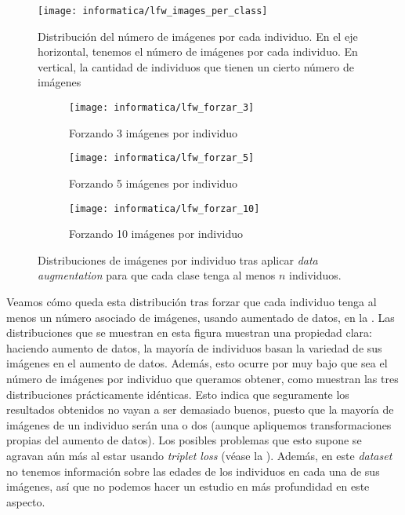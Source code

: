 \begin{figure}[!hbtp]
    \centering
    \texttt{[image: informatica/lfw\_images\_per\_class]}
    \caption{Distribución del número de imágenes por cada individuo. En el eje horizontal, tenemos el número de imágenes por cada individuo. En vertical, la cantidad de individuos que tienen un cierto número de imágenes}
    \label{img:ejemplo_cacd}
\end{figure}

\begin{figure}[hbtp!]
\centering
    \begin{subfigure}{0.5\textwidth}
        \centering
        \texttt{[image: informatica/lfw\_forzar\_3]}
        \caption{Forzando 3 imágenes por individuo }
    \end{subfigure}%
    \begin{subfigure}{.5\textwidth}
        \centering
        \texttt{[image: informatica/lfw\_forzar\_5]}
        \caption{Forzando 5 imágenes por individuo}
    \end{subfigure}

    \begin{subfigure}{.5\textwidth}
        \centering
        \texttt{[image: informatica/lfw\_forzar\_10]}
        \caption{Forzando 10 imágenes por individuo }
    \end{subfigure}

    \caption{Distribuciones de imágenes por individuo tras aplicar \textit{data augmentation} para que cada clase tenga al menos $n$ individuos.}
    \label{img:distribuciones_forzar_data_augmentation}
\end{figure}

Veamos cómo queda esta distribución tras forzar que cada individuo tenga al menos un número asociado de imágenes, usando aumentado de datos, en la . Las distribuciones que se muestran en esta figura muestran una propiedad clara: haciendo aumento de datos, la mayoría de individuos basan la variedad de sus imágenes en el aumento de datos. Además, esto ocurre por muy bajo que sea el número de imágenes por individuo que queramos obtener, como muestran las tres distribuciones prácticamente idénticas. Esto indica que seguramente los resultados obtenidos no vayan a ser demasiado buenos, puesto que la mayoría de imágenes de un individuo serán una o dos  (aunque apliquemos transformaciones propias del aumento de datos). Los posibles problemas que esto supone se agravan aún más al estar usando \textit{triplet loss} (véase la ). Además, en este \textit{dataset} no tenemos información sobre las edades de los individuos en cada una de sus imágenes, así que no podemos hacer un estudio en más profundidad en este aspecto.

